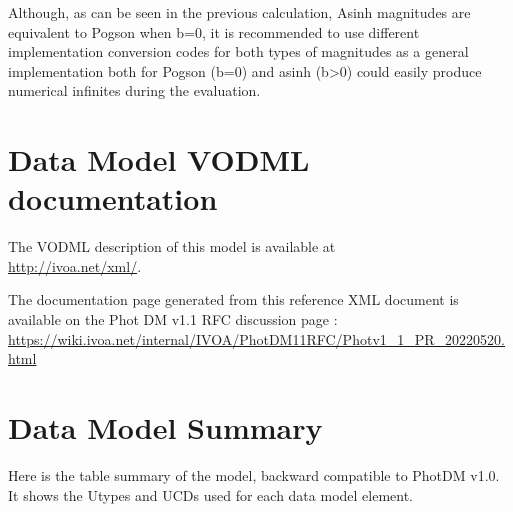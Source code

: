 \documentclass[11pt,a4paper]{ivoa}
\begin{document}
\begin{appendices}
Although, as can be seen in the previous calculation, Asinh magnitudes are equivalent to Pogson
when b=0, it is recommended to use different implementation conversion codes for both types of magnitudes as a general implementation both for Pogson (b=0) and asinh (b>0) could easily produce numerical infinites during the evaluation.
\par

\section{Data Model VODML documentation}

The VODML description of this model is available at \\ \url{http://ivoa.net/xml/}.

The documentation page generated from this reference XML document is available on the Phot DM v1.1 RFC discussion page : \\
\url{https://wiki.ivoa.net/internal/IVOA/PhotDM11RFC/Photv1_1_PR_20220520.html}

\section{Data Model Summary}
Here is the table summary  of the model, backward compatible to PhotDM v1.0. 
It shows the Utypes and UCDs used for each data model element. 



\end{appendices}
\end{document}

